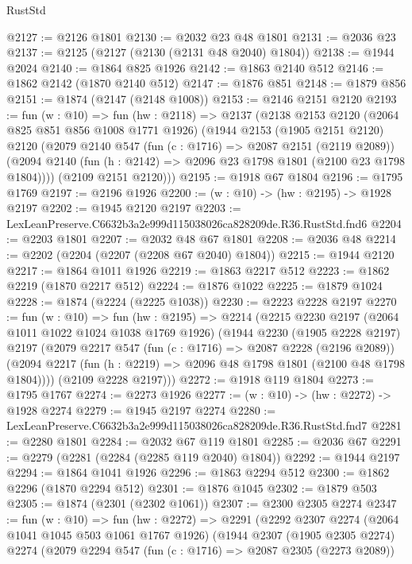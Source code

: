 \begin{lexlean}{RustStd}
\begin{coremodule}
@2127 := @2126 @1801
@2130 := @2032 @23 @48 @1801
@2131 := @2036 @23
@2137 := @2125 (@2127 (@2130 (@2131 @48 @2040) @1804))
@2138 := @1944 @2024
@2140 := @1864 @825 @1926
@2142 := @1863 @2140 @512
@2146 := @1862 @2142 (@1870 @2140 @512)
@2147 := @1876 @851
@2148 := @1879 @856
@2151 := @1874 (@2147 (@2148 @1008))
@2153 := @2146 @2151 @2120
@2193 := fun (w : @10) =>
  fun (hw : @2118) =>
  @2137
    (@2138
      @2153
      @2120
      (@2064 @825 @851 @856 @1008 @1771 @1926)
      (@1944
        @2153
        (@1905 @2151 @2120)
        @2120
        (@2079
          @2140
          @547
          (fun (c : @1716) => @2087 @2151 (@2119 @2089))
          (@2094 @2140 (fun (h : @2142) => @2096 @23 @1798 @1801 (@2100 @23 @1798 @1804))))
        (@2109 @2151 @2120)))
@2195 := @1918 @67 @1804
@2196 := @1795 @1769
@2197 := @2196 @1926
@2200 := (w : @10) -> (hw : @2195) -> @1928 @2197
@2202 := @1945 @2120 @2197
@2203 := LexLeanPreserve.C6632b3a2e999d115038026ca828209de.R36.RustStd.fnd6
@2204 := @2203 @1801
@2207 := @2032 @48 @67 @1801
@2208 := @2036 @48
@2214 := @2202 (@2204 (@2207 (@2208 @67 @2040) @1804))
@2215 := @1944 @2120
@2217 := @1864 @1011 @1926
@2219 := @1863 @2217 @512
@2223 := @1862 @2219 (@1870 @2217 @512)
@2224 := @1876 @1022
@2225 := @1879 @1024
@2228 := @1874 (@2224 (@2225 @1038))
@2230 := @2223 @2228 @2197
@2270 := fun (w : @10) =>
  fun (hw : @2195) =>
  @2214
    (@2215
      @2230
      @2197
      (@2064 @1011 @1022 @1024 @1038 @1769 @1926)
      (@1944
        @2230
        (@1905 @2228 @2197)
        @2197
        (@2079
          @2217
          @547
          (fun (c : @1716) => @2087 @2228 (@2196 @2089))
          (@2094 @2217 (fun (h : @2219) => @2096 @48 @1798 @1801 (@2100 @48 @1798 @1804))))
        (@2109 @2228 @2197)))
@2272 := @1918 @119 @1804
@2273 := @1795 @1767
@2274 := @2273 @1926
@2277 := (w : @10) -> (hw : @2272) -> @1928 @2274
@2279 := @1945 @2197 @2274
@2280 := LexLeanPreserve.C6632b3a2e999d115038026ca828209de.R36.RustStd.fnd7
@2281 := @2280 @1801
@2284 := @2032 @67 @119 @1801
@2285 := @2036 @67
@2291 := @2279 (@2281 (@2284 (@2285 @119 @2040) @1804))
@2292 := @1944 @2197
@2294 := @1864 @1041 @1926
@2296 := @1863 @2294 @512
@2300 := @1862 @2296 (@1870 @2294 @512)
@2301 := @1876 @1045
@2302 := @1879 @503
@2305 := @1874 (@2301 (@2302 @1061))
@2307 := @2300 @2305 @2274
@2347 := fun (w : @10) =>
  fun (hw : @2272) =>
  @2291
    (@2292
      @2307
      @2274
      (@2064 @1041 @1045 @503 @1061 @1767 @1926)
      (@1944
        @2307
        (@1905 @2305 @2274)
        @2274
        (@2079
          @2294
          @547
          (fun (c : @1716) => @2087 @2305 (@2273 @2089))

\end{coremodule}
\end{lexlean}
